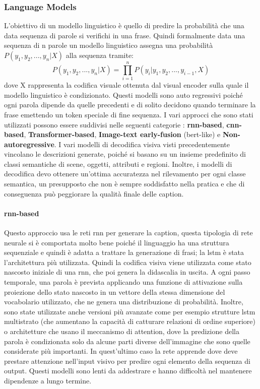 \subsubsection{Language Models}
L'obiettivo di un modello linguistico è quello di predire la probabilità che una data sequenza di parole si verifichi in una frase. Quindi formalmente data una sequenza di n parole un modello linguistico assegna una probabilità $P(y_1, y_2, ..., y_n|X)$ alla sequenza tramite:
\begin{equation}
\label{eqn:formula_caption}
P(y_1, y_2, ..., y_n|X) = \prod_{i=1}^{n}P(y_i|y_1, y_2, ..., y_{i-1},X)
\end{equation}
dove X rappresenta la codifica visuale ottenuta dal visual encoder sulla quale il modello linguistico è condizionato. Questi modelli sono auto regressivi poiché ogni parola dipende da quelle precedenti e di solito decidono quando terminare la frase emettendo un token speciale di fine sequenza.
I vari approcci che sono stati utilizzati possono essere suddivisi nelle seguenti categorie \cite{stefanini2021show}: \textbf{\acrshort{rnn}-based}, \textbf{\acrshort{cnn}-based}, \textbf{Transformer-based}, \textbf{Image-text early-fusion} (\acrshort{bert}-like) e \textbf{Non-autoregressive}.
I vari modelli di decodifica visiva visti precedentemente vincolano le descrizioni generate, poiché si basano su un insieme predefinito di classi semantiche di scene, oggetti, attributi e regioni. Inoltre, i modelli di decodifica devo ottenere un'ottima accuratezza nel rilevamento per ogni classe semantica, un presupposto che non è sempre soddisfatto nella pratica e che di conseguenza può peggiorare la qualità finale delle caption.
\paragraph{\acrshort{rnn}-based}
Questo approccio usa le reti \acrfull{rnn} per generare la caption, questa tipologia di rete neurale si è comportata molto bene poiché il linguaggio ha una struttura sequenziale e quindi è adatta a trattare la generazione di frasi; la \acrfull{lstm} è stata l'architettura più utilizzata. Quindi la codifica visiva viene utilizzata come stato nascosto iniziale di una \acrshort{rnn}, che poi genera la didascalia in uscita. A ogni passo temporale, una parola è prevista applicando una funzione di attivazione sulla proiezione dello stato nascosto in un vettore della stessa dimensione del vocabolario utilizzato, che ne genera una distribuzione di probabilità.
Inoltre, sono state utilizzate anche versioni più avanzate come per esempio strutture \acrshort{lstm} multistrato (che aumentano la capacità di catturare relazioni di ordine superiore) o architetture che usano il meccanismo di attention, dove la predizione della parola è condizionata solo da alcune parti diverse dell'immagine che sono quelle considerate più importanti. In quest'ultimo caso la rete apprende dove deve prestare attenzione nell'input visivo per predire ogni elemento della sequenza di output.
Questi modelli sono lenti da addestrare e hanno difficoltà nel mantenere dipendenze a lungo termine.

